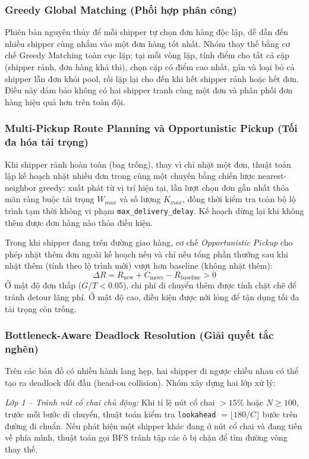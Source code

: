 \documentclass[conference]{IEEEtran}
\begin{document}
\subsubsection{Greedy Global Matching (Phối hợp phân công)}
Phiên bản nguyên thủy để mỗi shipper tự chọn đơn hàng độc lập, dễ dẫn đến nhiều shipper cùng nhắm vào một đơn hàng tốt nhất. Nhóm thay thế bằng cơ chế Greedy Matching toàn cục lặp: tại mỗi vòng lặp, tính điểm cho tất cả cặp (shipper rảnh, đơn hàng khả thi), chọn cặp có điểm cao nhất, gán và loại bỏ cả shipper lẫn đơn khỏi pool, rồi lặp lại cho đến khi hết shipper rảnh hoặc hết đơn. Điều này đảm bảo không có hai shipper tranh cùng một đơn và phân phối đơn hàng hiệu quả hơn trên toàn đội.
 
\subsubsection{Multi-Pickup Route Planning và Opportunistic Pickup (Tối đa hóa tải trọng)}
Khi shipper rảnh hoàn toàn (bag trống), thay vì chỉ nhặt một đơn, thuật toán lập kế hoạch nhặt nhiều đơn trong cùng một chuyến bằng chiến lược nearest-neighbor greedy: xuất phát từ vị trí hiện tại, lần lượt chọn đơn gần nhất thỏa mãn ràng buộc tải trọng $W_{max}$ và số lượng $K_{max}$, đồng thời kiểm tra toàn bộ lộ trình tạm thời không vi phạm \texttt{max\_delivery\_delay}. Kế hoạch dừng lại khi không thêm được đơn hàng nào thỏa điều kiện.
 
Trong khi shipper đang trên đường giao hàng, cơ chế \textit{Opportunistic Pickup} cho phép nhặt thêm đơn ngoài kế hoạch nếu và chỉ nếu tổng phần thưởng sau khi nhặt thêm (tính theo lộ trình mới) vượt hơn baseline (không nhặt thêm):
\begin{equation}
\Delta R = R_{\text{new}} + C_{\text{move}} - R_{\text{baseline}} > 0
\end{equation}
Ở mật độ đơn thấp ($G/T < 0.05$), chi phí di chuyển thêm được tính chặt chẽ để tránh detour lãng phí. Ở mật độ cao, điều kiện được nới lỏng để tận dụng tối đa tải trọng còn trống.
 
\subsubsection{Bottleneck-Aware Deadlock Resolution (Giải quyết tắc nghẽn)}
Trên các bản đồ có nhiều hành lang hẹp, hai shipper đi ngược chiều nhau có thể tạo ra deadlock đối đầu (head-on collision). Nhóm xây dựng hai lớp xử lý:
 
\textit{Lớp 1 -- Tránh nút cổ chai chủ động:} Khi tỉ lệ nút cổ chai $> 15\%$ hoặc $N \ge 100$, trước mỗi bước di chuyển, thuật toán kiểm tra \texttt{lookahead} $= \lfloor 180/C \rfloor$ bước trên đường đi chuẩn. Nếu phát hiện một shipper khác đang ở nút cổ chai và đang tiến về phía mình, thuật toán gọi BFS tránh tập các ô bị chặn để tìm đường vòng thay thế.
 
\end{document}
